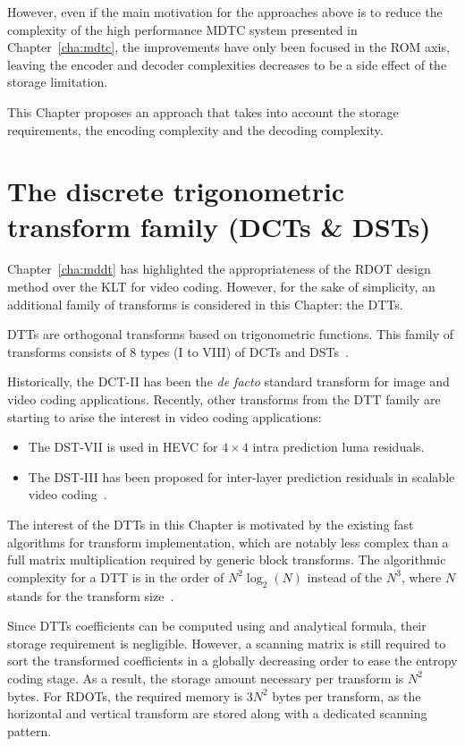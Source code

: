 \documentclass[11pt,a4paper,openright,twoside]{book}
\numberwithin{equation}{section} %
\numberwithin{figure}{section} %
\numberwithin{table}{section} %
\begin{document}
However, even if the main motivation for the approaches above is to reduce
the complexity of the high performance \ac{MDTC} system presented in
Chapter~\ref{cha:mdtc}, the improvements have only been focused in the
\acs{ROM} axis, leaving the encoder and decoder complexities decreases to be a
side effect of the storage limitation.

This Chapter proposes an approach that takes into account the storage
requirements, the encoding complexity and the decoding complexity.

\section{The discrete trigonometric transform family (\acsp{DCT} \& \acsp{DST})}
\label{sec:the_dtt_family}

Chapter~\ref{cha:mddt} has highlighted the appropriateness of the \ac{RDOT}
design method over the \ac{KLT} for video coding.
However, for the sake of simplicity, an additional family of transforms is
considered in this Chapter: the \acfp{DTT}.

\acsp{DTT} are orthogonal transforms based on trigonometric functions.
This family of transforms consists of 8 types (I to VIII) of \acfp{DCT} and
\acfp{DST}~\cite{rao-01-transform-data-compression-book,
puschel-08-algorithms-dct-dst}.

Historically, the \ac{DCT}-II has been the \emph{de facto} standard transform
for image and video coding applications.
Recently, other transforms from the \ac{DTT} family are starting to arise the
interest in video coding applications:
\begin{itemize}
	\item The \ac{DST}-VII is used in \ac{HEVC} for $4\times4$ intra
		prediction luma residuals.
	\item The \ac{DST}-III has been proposed for inter-layer prediction
		residuals in scalable video
		coding~\cite{guo-14-transform-inter-layer-scalable}.
\end{itemize}

The interest of the \acp{DTT} in this Chapter is motivated by the existing
fast algorithms for transform implementation, which are notably less complex
than a full matrix multiplication required by generic block transforms.
The algorithmic complexity for a \ac{DTT} is in the order of $N^2\log_2(N)$
instead of the $N^3$, where $N$ stands for the transform
size~\cite{puschel-08-algorithms-dct-dst}.

Since \acp{DTT} coefficients can be computed using and analytical formula,
their storage requirement is negligible.
However, a scanning matrix is still required to sort the transformed
coefficients in a globally decreasing order to ease the entropy coding stage.
As a result, the storage amount necessary per transform is $N^2$ bytes.
For \acp{RDOT}, the required memory is $3N^2$ bytes per transform, as the
horizontal and vertical transform are stored along with a dedicated scanning
pattern.
\end{document}
